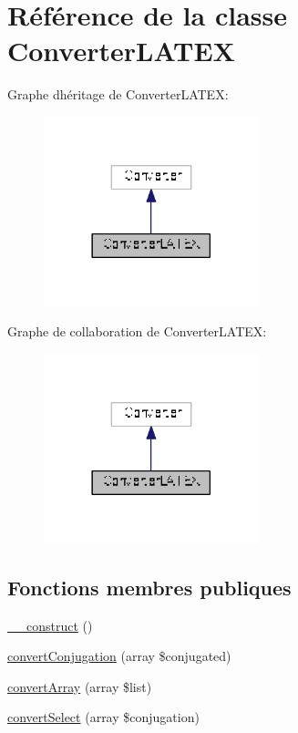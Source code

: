 \hypertarget{class_converter_l_a_t_e_x}{}\section{Référence de la classe Converter\+L\+A\+T\+EX}
\label{class_converter_l_a_t_e_x}


Graphe d\textquotesingle{}héritage de Converter\+L\+A\+T\+EX\+:
\nopagebreak
\begin{figure}[H]
\begin{center}
\leavevmode
\includegraphics[width=177pt]{class_converter_l_a_t_e_x__inherit__graph}
\end{center}
\end{figure}


Graphe de collaboration de Converter\+L\+A\+T\+EX\+:
\nopagebreak
\begin{figure}[H]
\begin{center}
\leavevmode
\includegraphics[width=177pt]{class_converter_l_a_t_e_x__coll__graph}
\end{center}
\end{figure}
\subsection*{Fonctions membres publiques}
\begin{DoxyCompactItemize}
\item 
\hyperlink{class_converter_l_a_t_e_x_a9f95639d71711394c59d0afd7b516d89}{\+\_\+\+\_\+construct} ()
\item 
\hyperlink{class_converter_l_a_t_e_x_ada7781cb4daaf2f4a2f0c69e1d2f24e6}{convert\+Conjugation} (array \$conjugated)
\item 
\hyperlink{class_converter_l_a_t_e_x_a1a30f6b145b4cb051d9dbbf8f9e8978f}{convert\+Array} (array \$list)
\item 
\hyperlink{class_converter_l_a_t_e_x_a21a5d5c23b40c7bb3b5cd7ebdbee3cae}{convert\+Select} (array \$conjugation)
\end{DoxyCompactItemize}
